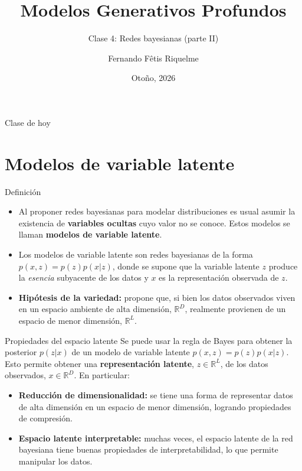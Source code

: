 \documentclass{beamer}
\title{Modelos Generativos Profundos}
\subtitle{Clase 4: Redes bayesianas (parte II)}
\author{Fernando Fêtis Riquelme}
\institute{
    Facultad de Ciencias Físicas y Matemáticas\\
    Universidad de Chile
}
\date{Otoño, 2026}
\newcommand{\R}{\mathbb{R}}
\begin{document}
\begin{frame}
    \titlepage
\end{frame}

\begin{frame}{Clase de hoy}
    \tableofcontents
\end{frame}

\section{Modelos de variable latente}

\begin{frame}{Definición}
    \begin{itemize}
        \item Al proponer redes bayesianas para modelar distribuciones es usual asumir la existencia de \textbf{variables ocultas} cuyo valor no se conoce. Estos modelos se llaman \textbf{modelos de variable latente}.
        \item Los modelos de variable latente son redes bayesianas de la forma $p(x,z)=p(z)p(x|z)$, donde se supone que la variable latente $z$ produce la \textit{esencia} subyacente de los datos y $x$ es la representación observada de $z$.
        \item \textbf{Hipótesis de la variedad:} propone que, si bien los datos observados viven en un espacio ambiente de alta dimensión, $\R^D$, realmente provienen de un espacio de menor dimensión, $\R^L$.
    \end{itemize}
\end{frame}

\begin{frame}{Propiedades del espacio latente}
    Se puede usar la regla de Bayes para obtener la posterior $p(z|x)$ de un modelo de variable latente $p(x,z)=p(z)p(x|z)$. Esto permite obtener una \textbf{representación latente}, $z\in\R^L$, de los datos observados, $x\in\R^D$. En particular:
    \begin{itemize}
        \item \textbf{Reducción de dimensionalidad:} se tiene una forma de representar datos de alta dimensión en un espacio de menor dimensión, logrando propiedades de compresión.
        \item \textbf{Espacio latente interpretable:} muchas veces, el espacio latente de la red bayesiana tiene buenas propiedades de interpretabilidad, lo que permite manipular los datos.
    \end{itemize}
\end{frame}
\end{document}
